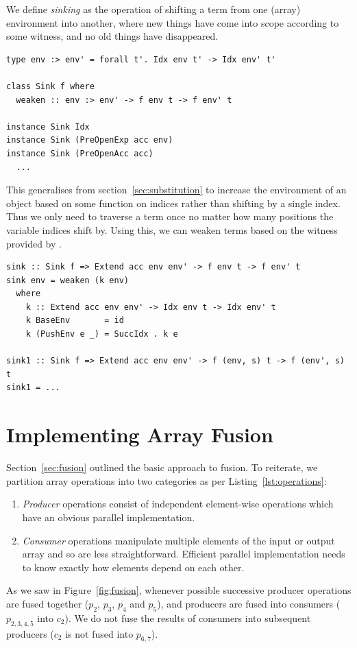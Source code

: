 We define \emph{sinking} as the operation of shifting a term from one (array)
environment into another, where new things have come into scope according to
some witness, and no old things have disappeared.
%
\begin{lstlisting}[style=haskell,caption={Sinking terms to a larger environment}]
type env :> env' = forall t'. Idx env t' -> Idx env' t'

class Sink f where
  weaken :: env :> env' -> f env t -> f env' t

instance Sink Idx
instance Sink (PreOpenExp acc env)
instance Sink (PreOpenAcc acc)
  ...
\end{lstlisting}
%
This generalises  from section~\ref{sec:substitution} to increase
the environment of an object  based on some function on indices rather
than shifting by a single  index. Thus we only need to
traverse a term once no matter how many positions the variable indices shift by.
Using this, we can weaken terms based on the witness provided by
.
%
\begin{lstlisting}[style=haskell,firstnumber=last]
sink :: Sink f => Extend acc env env' -> f env t -> f env' t
sink env = weaken (k env)
  where
    k :: Extend acc env env' -> Idx env t -> Idx env' t
    k BaseEnv       = id
    k (PushEnv e _) = SuccIdx . k e

sink1 :: Sink f => Extend acc env env' -> f (env, s) t -> f (env', s) t
sink1 = ...
\end{lstlisting}


\section{Implementing Array Fusion}
\label{sec:implementing_array_fusion}

Section~\ref{sec:fusion} outlined the basic approach to fusion. To reiterate, we
partition array operations into two categories as per
Listing~\ref{lst:operations}:
%
\begin{enumerate}
    \item {}\emph{Producer} operations consist of independent
        element-wise operations which have an obvious parallel implementation.

    \item {}\emph{Consumer} operations manipulate multiple
        elements of the input or output array and so are less straightforward.
        Efficient parallel implementation needs to know exactly how elements
        depend on each other.
\end{enumerate}
%
As we saw in Figure~\ref{fig:fusion}, whenever possible successive producer
operations are fused together ($p_2$, $p_3$, $p_4$ and $p_5$), and producers are
fused into consumers ($p_{ 2,3,4,5 }$ into $ c_2$). We do not fuse the results
of consumers into subsequent producers ($c_2$ is not fused into $p_{ 6,7 }$).

